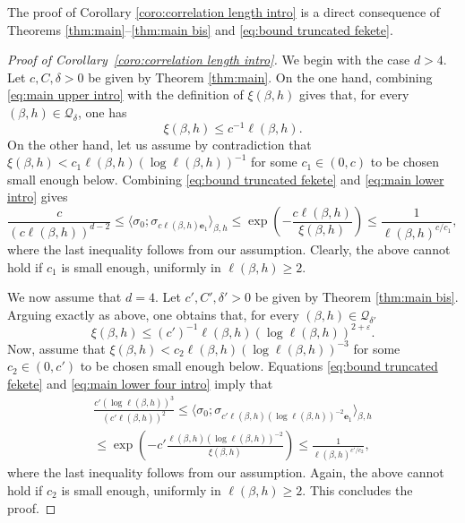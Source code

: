 \documentclass[11pt,a4paper]{article}
\numberwithin{equation}{section}
\theoremstyle{plain}
\theoremstyle{definition}
\begin{document}
	The proof of Corollary \ref{coro:correlation length intro} is a direct consequence of Theorems \ref{thm:main}--\ref{thm:main bis} and \eqref{eq:bound truncated fekete}.
\begin{proof}[Proof of Corollary~\textup{\ref{coro:correlation length intro}}] We begin with the case $d>4$. Let $c,C,\delta>0$ be given by Theorem \ref{thm:main}. On the one hand, combining \eqref{eq:main upper intro} with the definition of $\xi(\beta,h)$ gives that, for every $(\beta,h)\in \mathcal Q_\delta$, one has 
\begin{equation}
\xi(\beta,h)\leq c^{-1}\ell(\beta,h).
\end{equation}
On the other hand, let us assume by contradiction that $\xi(\beta,h)< c_1\ell(\beta,h)(\log \ell(\beta,h))^{-1}$ for some $c_1\in (0,c)$ to be chosen small enough below. Combining \eqref{eq:bound truncated fekete} and \eqref{eq:main lower intro} gives
\begin{equation}
	\frac{c}{(c\ell(\beta,h))^{d-2}}\leq \langle \sigma_0;\sigma_{c\ell(\beta,h)\mathbf{e}_1}\rangle_{\beta,h}\leq \exp\left(-\frac{c\ell(\beta,h)}{\xi(\beta,h)}\right)\leq \frac{1}{\ell(\beta,h)^{c/c_1}},
\end{equation}
where the last inequality follows from our assumption. Clearly, the above cannot hold if $c_1$ is small enough, uniformly in $\ell(\beta,h)\geq 2$. 

We now assume that $d=4$. Let $c',C',\delta'>0$ be given by Theorem \ref{thm:main bis}. Arguing exactly as above, one obtains that, for every $(\beta,h)\in \mathcal Q_{\delta'}$
\begin{equation}
	\xi(\beta,h)\leq (c')^{-1}\ell(\beta,h)(\log \ell(\beta,h))^{2+\varepsilon}.
\end{equation}
Now, assume that $\xi(\beta,h)<c_2 \ell(\beta,h)(\log \ell(\beta,h))^{-3}$ for some $c_2\in (0,c')$ to be chosen small enough below. Equations
 \eqref{eq:bound truncated fekete} and \eqref{eq:main lower four intro} imply that
\begin{multline}
	\frac{c'(\log \ell(\beta,h))^3}{(c'\ell(\beta,h))^2}\leq \langle \sigma_0;\sigma_{c'\ell(\beta,h)(\log \ell(\beta,h))^{-2}\mathbf{e}_1}\rangle_{\beta,h}\\\leq \exp\left(-c'\frac{\ell(\beta,h)(\log \ell(\beta,h))^{-2}}{\xi(\beta,h)}\right)\leq \frac{1}{\ell(\beta,h)^{c'/c_2}},
\end{multline}
where the last inequality follows from our assumption. Again, the above cannot hold if $c_2$ is small enough, uniformly in $\ell(\beta,h)\geq 2$. This concludes the proof.
\end{proof}
\end{document}
